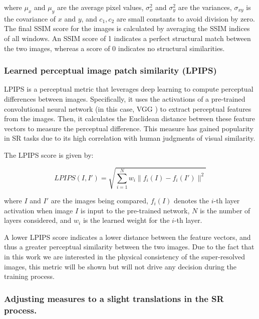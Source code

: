         where $\mu_x$ and $\mu_y$ are the average pixel values, $\sigma_x^2$ and $\sigma_y^2$ are the variances, $\sigma_{xy}$ is the covariance of $x$ and $y$, and $c_1, c_2$ are small constants to avoid division by zero.
        The final SSIM score for the images is calculated by averaging the SSIM indices of all windows. An SSIM score of 1 indicates a perfect structural match between the two images, whereas a score of 0 indicates no structural similarities.

        \subsubsection{Learned perceptual image patch similarity (LPIPS)}

        LPIPS is a perceptual metric that leverages deep learning to compute perceptual differences between images. Specifically, it uses the activations of a pre-trained convolutional neural network (in this case, VGG \cite{VGGnet} ) to extract perceptual features from the images. 
        Then, it calculates the Euclidean distance between these feature vectors to measure the perceptual difference.
        This measure has gained popularity in SR tasks due to its high correlation with human judgments of visual similarity.
        
        The LPIPS score is given by:
        
        \begin{equation}
        LPIPS(I, I') = \sqrt{\sum_{i=1}^{N} w_i\|f_i(I)-f_i(I')\|^2}
        \end{equation}
        
        where $I$ and $I'$ are the images being compared, $f_i(I)$ denotes the $i$-th layer activation when image $I$ is input to the pre-trained network, $N$ is the number of layers considered, and $w_i$ is the learned weight for the $i$-th layer.
        
        A lower LPIPS score indicates a lower distance between the feature vectors, and thus a greater perceptual similarity between the two images. 
        Due to the fact that in this work we are interested in the physical consistency of the super-resolved images, 
        this metric will be shown but will not drive any decision during the training process.
        

        \subsubsection{Adjusting measures to a slight translations in the SR process.}
    

